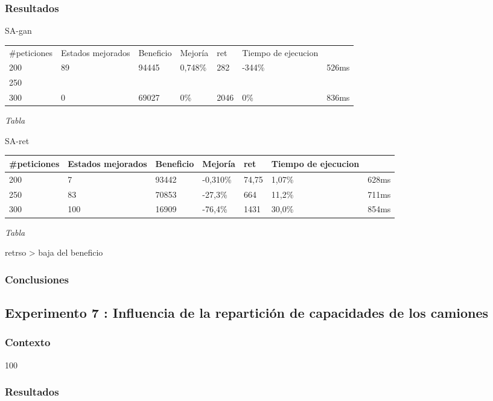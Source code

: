 \documentclass{article}
\begin{document}
\subsubsection{Resultados}
SA-gan
\begin{center}
\begin{tabular}{|l||l|l|l||l|l|l|}
\hline
\#peticiones & Estados mejorados & Beneficio & Mejoría & ret & Tiempo de
ejecucion\\
200 & 89 & 94445 & 0,748\% & 282 & -344\% & 526ms\\
\hline
250 & & & & & & \\
\hline
300 & 0 & 69027 & 0\% & 2046 & 0\% & 836ms\\
\hline
\end{tabular}
{\it Tabla}
\end{center}
SA-ret
\begin{center}
\begin{tabular}{|l||l|l|l||l|l|l|}
\hline
\#peticiones & Estados mejorados & Beneficio & Mejoría & ret & Tiempo de
ejecucion\\
\hline
200 & 7 & 93442 & -0,310\% & 74,75 & 1,07\% & 628ms\\
\hline
250 & 83 & 70853 & -27,3\% & 664 & 11,2\% & 711ms\\
\hline
300 & 100 & 16909 & -76,4\% & 1431 & 30,0\% & 854ms\\
\hline
\end{tabular}
{\it Tabla}
\end{center}

retrso > baja del beneficio


\subsubsection{Conclusiones}

\subsection{Experimento 7 : Influencia de la repartición de capacidades
de los camiones}

\subsubsection{Contexto}
100

\subsubsection{Resultados}
\end{document}
